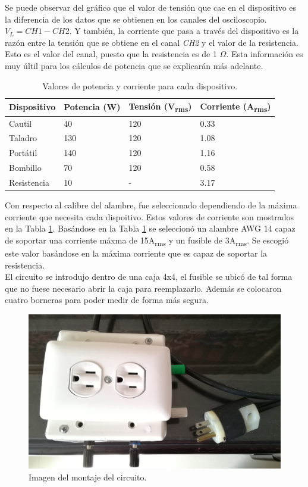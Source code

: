 \documentclass[journal]{IEEEtran}
\begin{document}
Se puede observar del
gráfico que el valor de tensión que cae en el dispositivo
es la diferencia de los datos que se obtienen en los canales 
del osciloscopio. $V_L = CH1 - CH2$. Y también,  
la corriente que 
pasa a través del dispositivo es la razón entre la tensión 
que se obtiene en el canal \textit{CH2} y el valor de la 
resistencia. Esto es el valor del canal, puesto que 
la resistencia es de 1 $\Omega$. Esta información es muy
últil para los cálculos de potencia que se explicarán más 
adelante.

\begin{table}[h]
\centering
\begin{tabular}{|l|p{1.2cm}|p{1.5cm}|p{1.5cm}|}
\hline 
Dispositivo & Potencia (W) & Tensión (V\textsubscript{rms}) 
& Corriente (A\textsubscript{rms}) \\ \hline 
Cautil 	&  40	& 120 	& 0.33 \\ \hline 
Taladro 		& 130	& 120   & 1.08 \\ \hline 
Portátil 		& 140 	& 120   & 1.16 \\ \hline 
Bombillo		& 70  	& 120   & 0.58 \\ \hline 
Resistencia & 10 & - & 3.17 \\ \hline
\end{tabular}
\caption{Valores de potencia y corriente para cada dispositivo.}
\label{current_table}
\end{table}

Con respecto al calibre del alambre, fue seleccionado 
dependiendo de la máxima corriente que necesita cada 
dispoitivo. Estos
valores de corriente son mostrados en la Tabla
\ref{current_table}. Basándose en la 
Tabla \ref{current_table} se seleccionó un alambre 
AWG 14 capaz de soportar una corriente máxma de 
15A\textsubscript{rms} y un fusible de  
3A\textsubscript{rms}. Se escogió este valor basándose
en la máxima corriente que es capaz de soportar la 
resistencia. \\

El circuito se introdujo dentro de una caja 4x4, el 
fusible se ubicó de tal forma que no fuese necesario 
abrir la caja para reemplazarlo. 
Además se colocaron 
cuatro borneras para poder medir de forma más segura. 

\begin{figure}[h]
\centering
\includegraphics[clip,width=0.7\columnwidth]{circuit_box.png}
\caption{Imagen del montaje del circuito.}
\label{circuit_box}
\end{figure}
\end{document}
